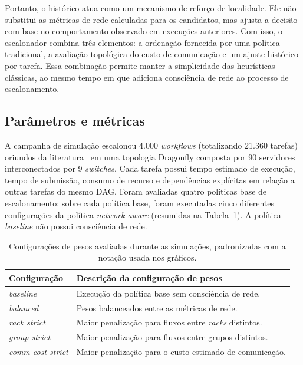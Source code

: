 \documentclass[12pt]{article}
\begin{document}
Portanto, o histórico atua como um mecanismo de reforço de localidade. 
%
Ele não substitui as métricas de rede calculadas para os candidatos, mas ajusta a decisão com base no comportamento observado em execuções anteriores. Com isso, o escalonador combina três elementos: a ordenação fornecida por uma política tradicional, a avaliação topológica do custo de comunicação e um ajuste histórico por tarefa. Essa combinação permite manter a simplicidade das heurísticas clássicas, ao mesmo tempo em que adiciona consciência de rede ao processo de escalonamento.

\subsection{Parâmetros e métricas}
\label{subsec:configuracao_experimentos}

A campanha de simulação escalonou 4.000 \textit{workflows} (totalizando 21.360 tarefas) oriundos da literatura~\cite{juve2013characterizing} em uma topologia Dragonfly composta por 90 servidores interconectados por 9 \textit{switches}.
%
Cada tarefa possui tempo estimado de execução, tempo de submissão, consumo de recurso e dependências explícitas em relação a outras tarefas do mesmo DAG.
%
Foram avaliadas quatro políticas base de escalonamento; sobre cada política base, foram executadas cinco diferentes configurações da política \textit{network-aware} (resumidas na Tabela~\ref{tab:cenarios_avaliados}). 
%
A política \textit{baseline} não possui consciência de rede. 

\begin{table}[h!]
\centering
\caption{Configurações de pesos avaliadas durante as simulações, padronizadas com a notação usada nos gráficos.}
\label{tab:cenarios_avaliados}
\begin{tabular}{ll}
\hline
\textbf{Configuração} & \textbf{Descrição da configuração de pesos} \\
\hline
\textit{baseline} & Execução da política base sem consciência de rede. \\
\textit{balanced} & Pesos balanceados entre as métricas de rede. \\
\textit{rack strict} & Maior penalização para fluxos entre \textit{racks} distintos. \\
\textit{group strict} & Maior penalização para fluxos entre grupos distintos. \\
\textit{comm cost strict} & Maior penalização para o custo estimado de comunicação. \\
\hline
\end{tabular}
\end{table}
\end{document}
